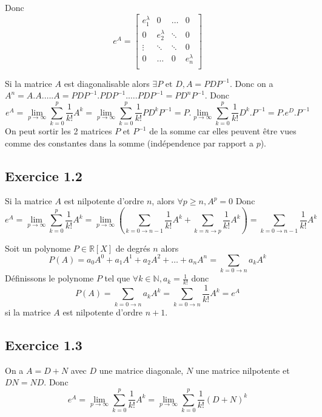 \documentclass[]{book}
\theoremstyle{definition}
\newcommand{\bb}[1]{\mathbb{#1}}
\newcommand{\R}{\bb{R}}
\newcommand{\N}{\bb{N}}
\begin{document}
Donc
$$
e^A = 
\begin{bmatrix}
    e^\lambda_1 & 0 & \ldots & 0 \\    
    0 & e^\lambda_2  & \ddots & 0 \\
    \vdots & \ddots & \ddots & 0 \\    
    0 & \ldots & 0 & e^\lambda_n\\
\end{bmatrix}   
$$

Si la matrice $A$ est diagonalisable alors $\exists P \text{ et } D, A = PDP^{-1}$. Donc on a $A^n = A.A. \ldots . A = PDP^{-1}.PDP^{-1}.\ldots.PDP^{-1} = PD^nP^{-1}$. Donc
$$
e^A = \lim_{p \to \infty}\sum_{k = 0}^{p}{\frac{1}{k!}A^k} = \lim_{p \to \infty}\sum_{k = 0}^{p}{\frac{1}{k!}PD^kP^{-1}} = P.\lim_{p \to \infty}\sum_{k = 0}^{p}{\frac{1}{k!}D^k}.P^{-1} = P.e^D.P^{-1}
$$
On peut sortir les 2 matrices $P$ et $P^{-1}$ de la somme car elles peuvent \^etre vues comme des constantes dans la somme (ind\'ependence par rapport a $p$).

\subsection*{Exercice 1.2}
Si la matrice $A$ est nilpotente d'ordre $n$, alors $\forall p \geq n, A^p = 0$ Donc
$$
e^A = \lim_{p \to \infty}{\sum_{k = 0}^{p}{\frac{1}{k!}A^k}} = \lim_{p \to \infty}{\left(\sum_{k = 0 \to n-1}{\frac{1}{k!}A^k} + \sum_{k = n \to p}{\frac{1}{k!}A^k}\right)} =  \sum_{k = 0 \to n-1}{\frac{1}{k!}A^k}
$$

Soit un polynome $P \in \R[X]$ de degr\'es $n$ alors 
$$
P(A) = a_0 A^0 + a_1 A^1 + a_2 A^2 + \ldots + a_n A^n = \sum_{k=0 \to n}{a_k A^k}
$$
D\'efinissons le polynome $P$ tel que $\forall k \in \N, a_k = \frac{1}{k!}$
donc 
$$
P(A) = \sum_{k=0 \to n}{a_k A^k} = \sum_{k=0 \to n}{\frac{1}{k!} A^k} = e^A
$$
si la matrice $A$ est nilpotente d'ordre $n+1$. 

\subsection*{Exercice 1.3}
On a $A = D+N$ avec $D$ une matrice diagonale, $N$ une matrice nilpotente et $DN = ND$. Donc
$$
e^A = \lim_{p \to \infty}\sum_{k = 0}^{p}{\frac{1}{k!}A^k} = \lim_{p \to \infty}\sum_{k = 0}^{p}{\frac{1}{k!}(D+N)^k}
$$ 
\end{document}
